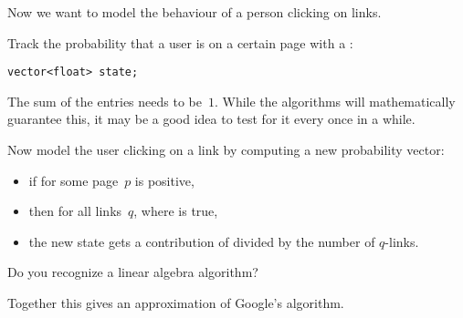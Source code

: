 Now we want to model the behaviour of a person clicking on links.

\begin{exercise}
  Track the probability that a user is on a certain page with a
  :
\begin{verbatim}
vector<float> state;
\end{verbatim}
  The sum of the entries needs to be~$1$. While the algorithms will
  mathematically guarantee this, it may be a good idea to test for it
  every once in a while.

  Now model the user clicking on a link by computing a new probability
  vector:
  \begin{itemize}
  \item if for some page~$p$  is positive,
  \item then for all links~$q$, where  is true,
  \item the new state gets a contribution of  divided by
    the number of $q$-links.
  \end{itemize}
  Do you recognize a linear algebra algorithm?
\end{exercise}

Together this gives an approximation of Google's 
algorithm.
